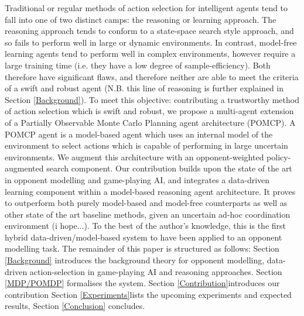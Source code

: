 \newline \newline
Traditional or regular methods of action selection for intelligent agents tend to fall into one of two distinct camps: the reasoning or learning approach. The reasoning approach tends to conform to a state-space search style approach, and so fails to perform well in large or dynamic environments. In contrast, model-free learning agents tend to perform well in complex environments, however require a large training time (i.e. they have a low degree of sample-efficiency). Both therefore have significant flaws, and therefore neither are able to meet the criteria of a swift and robust agent (N.B. this line of reasoning is further explained in Section \ref{Background}). 
\newline \newline
To meet this objective: contributing a trustworthy method of action selection which is swift and robust, we propose a multi-agent extension of a Partially Observable Monte Carlo Planning agent architecture (POMCP). A POMCP agent is a model-based agent which uses an internal model of the environment to select actions which is capable of performing in large uncertain environments. We augment this architecture with an opponent-weighted policy-augmented search component. Our contribution builds upon the state of the art in opponent modelling and game-playing AI, and integrates a data-driven learning component within a model-based reasoning agent architecture. It proves to outperform both purely model-based and model-free counterparts as well as other state of the art baseline methods, given an uncertain  ad-hoc coordination environment (i hope...). To the best of the author's knowledge, this is the first hybrid data-driven/model-based system to have been applied to an opponent modelling task. 
\newline \newline
The remainder of this paper is structured as follows: Section \ref{Background} introduces the background theory for opponent modelling, data-driven action-selection in game-playing AI and reasoning approaches. 
Section \ref{MDP/POMDP} formalises the system. 
Section \ref{Contribution}introduces our contribution
Section \ref{Experiments}lists the upcoming experiments and expected results, 
Section \ref{Conclusion} concludes. 
